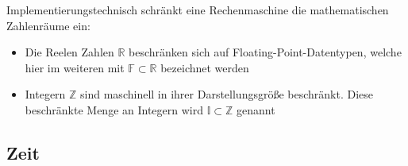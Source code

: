 Implementierungstechnisch schränkt eine Rechenmaschine die mathematischen Zahlenräume ein:
\begin{itemize}
\item Die Reelen Zahlen $\mathbb{R}$ beschränken sich auf Floating-Point-Datentypen, welche hier im weiteren mit $\mathbb{F} \subset \mathbb{R}$ bezeichnet werden
\item Integern $\mathbb{Z}$ sind maschinell in ihrer Darstellungsgröße beschränkt. Diese beschränkte Menge an Integern wird $\mathbb{I} \subset \mathbb{Z}$ genannt
\end{itemize}


\subsection{Zeit}

\def\finite#1{\ooalign{\hfil$\mapstochar\mkern 3mu\mapstochar\mkern 5mu$\hfil\cr$#1$}}

